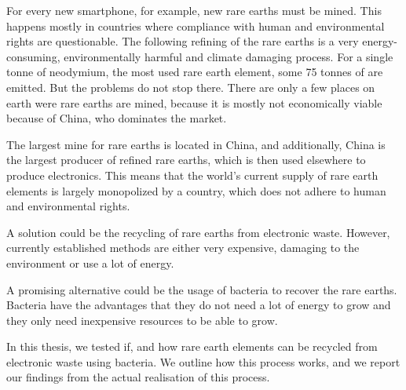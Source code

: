 For every new smartphone, for example, new rare earths must be mined.
This happens mostly in countries where compliance with human and environmental rights are questionable.
The following refining of the rare earths is a very energy-consuming, environmentally harmful and climate damaging process.
For a single tonne of neodymium, the most used rare earth element, some 75 tonnes of  are emitted.
But the problems do not stop there.
There are only a few places on earth were rare earths are mined, because it is mostly not economically viable because of China, who dominates the market.

The largest mine for rare earths is located in China, and additionally, China is the largest producer of refined rare earths, which is then used elsewhere to produce electronics.
This means that the world's current supply of rare earth elements is largely monopolized by a country, which does not adhere to human and environmental rights.

A solution could be the recycling of rare earths from electronic waste.
However, currently established methods are either very expensive, damaging to the environment or use a lot of energy.

A promising alternative could be the usage of bacteria to recover the rare earths.
Bacteria have the advantages that they do not need a lot of energy to grow and they only need inexpensive resources to be able to grow.

In this thesis, we tested if, and how rare earth elements can be recycled from electronic waste using bacteria.
We outline how this process works, and we report our findings from the actual realisation of this process.